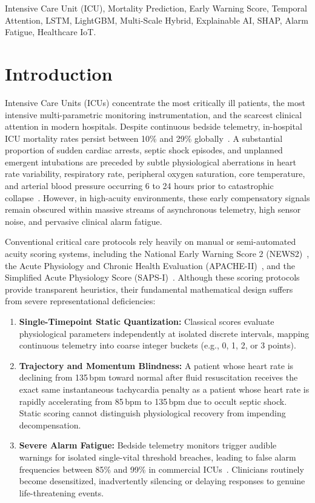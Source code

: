 \documentclass[conference]{IEEEtran}
\begin{document}
\begin{IEEEkeywords}
Intensive Care Unit (ICU), Mortality Prediction, Early Warning Score, Temporal Attention, LSTM, LightGBM, Multi-Scale Hybrid, Explainable AI, SHAP, Alarm Fatigue, Healthcare IoT.
\end{IEEEkeywords}

\section{Introduction}
Intensive Care Units (ICUs) concentrate the most critically ill patients, the most intensive multi-parametric monitoring instrumentation, and the scarcest clinical attention in modern hospitals. Despite continuous bedside telemetry, in-hospital ICU mortality rates persist between 10\% and 29\% globally~\cite{zheng2025}. A substantial proportion of sudden cardiac arrests, septic shock episodes, and unplanned emergent intubations are preceded by subtle physiological aberrations in heart rate variability, respiratory rate, peripheral oxygen saturation, core temperature, and arterial blood pressure occurring 6 to 24 hours prior to catastrophic collapse~\cite{choi2020, sendelbach2013}. However, in high-acuity environments, these early compensatory signals remain obscured within massive streams of asynchronous telemetry, high sensor noise, and pervasive clinical alarm fatigue.

Conventional critical care protocols rely heavily on manual or semi-automated acuity scoring systems, including the National Early Warning Score 2 (NEWS2)~\cite{news2}, the Acute Physiology and Chronic Health Evaluation (APACHE-II)~\cite{knaus1985}, and the Simplified Acute Physiology Score (SAPS-I)~\cite{le1984}. Although these scoring protocols provide transparent heuristics, their fundamental mathematical design suffers from severe representational deficiencies:
\begin{enumerate}
    \item \textbf{Single-Timepoint Static Quantization:} Classical scores evaluate physiological parameters independently at isolated discrete intervals, mapping continuous telemetry into coarse integer buckets (e.g., 0, 1, 2, or 3 points).
    \item \textbf{Trajectory and Momentum Blindness:} A patient whose heart rate is declining from 135\,bpm toward normal after fluid resuscitation receives the exact same instantaneous tachycardia penalty as a patient whose heart rate is rapidly accelerating from 85\,bpm to 135\,bpm due to occult septic shock. Static scoring cannot distinguish physiological recovery from impending decompensation.
    \item \textbf{Severe Alarm Fatigue:} Bedside telemetry monitors trigger audible warnings for isolated single-vital threshold breaches, leading to false alarm frequencies between 85\% and 99\% in commercial ICUs~\cite{sendelbach2013}. Clinicians routinely become desensitized, inadvertently silencing or delaying responses to genuine life-threatening events.
\end{enumerate}
\end{document}
